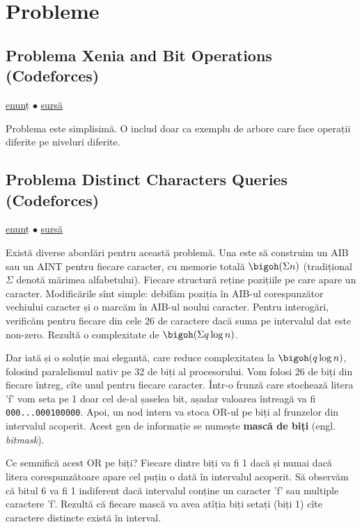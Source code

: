 \section{Probleme}

\subsection{Problema Xenia and Bit Operations (Codeforces)}
\label{problem:xenia-and-bit-operations}

\href{https://codeforces.com/contest/339/problem/D}{enunț}
$\bullet$
\hyperref[code:xenia-and-bit-operations]{sursă}

Problema este simplisimă. O includ doar ca exemplu de arbore care face operații diferite pe niveluri diferite.

\subsection{Problema Distinct Characters Queries (Codeforces)}
\label{problem:distinct-characters-queries}

\href{https://codeforces.com/contest/1234/problem/D}{enunț}
$\bullet$
\hyperref[code:distinct-characters-queries]{sursă}

Există diverse abordări pentru această problemă. Una este să construim un AIB sau un AINT pentru fiecare caracter, cu memorie totală $\bigoh(\Sigma n)$ (tradițional $\Sigma$ denotă mărimea alfabetului). Fiecare structură reține pozițiile pe care apare un caracter. Modificările sînt simple: debifăm poziția în AIB-ul corespunzător vechiului caracter și o marcăm în AIB-ul noului caracter. Pentru interogări, verificăm pentru fiecare din cele 26 de caractere dacă suma pe intervalul dat este non-zero. Rezultă o complexitate de $\bigoh(\Sigma q \log n)$.

Dar iată și o soluție mai elegantă, care reduce complexitatea la $\bigoh(q \log n)$, folosind paralelismul nativ pe 32 de biți al procesorului. Vom folosi 26 de biți din fiecare întreg, cîte unul pentru fiecare caracter. Într-o frunză care stochează litera 'f' vom seta pe 1 doar cel de-al șaselea bit, așadar valoarea întreagă va fi \texttt{000...000100000}. Apoi, un nod intern va stoca OR-ul pe biți al frunzelor din intervalul acoperit. Acest gen de informație se numește \textbf{mască de biți} (engl. \textit{bitmask}).

Ce semnifică acest OR pe biți? Fiecare dintre biți va fi 1 dacă și numai dacă litera corespunzătoare apare cel puțin o dată în intervalul acoperit. Să observăm că bitul 6 va fi 1 indiferent dacă intervalul conține un caracter 'f' sau multiple caractere 'f'. Rezultă că fiecare mască va avea atîția biți setați (biți 1) cîte caractere distincte există în interval.

